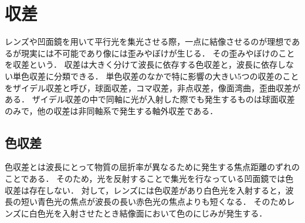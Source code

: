 

\section{収差}
レンズや凹面鏡を用いて平行光を集光させる際，一点に結像させるのが理想であるが現実には不可能であり像には歪みやぼけが生じる．
その歪みやぼけのことを収差という．
収差は大きく分けて波長に依存する色収差と，波長に依存しない単色収差に分類できる．
単色収差のなかで特に影響の大きい5つの収差のことをザイデル収差と呼び，球面収差，コマ収差，非点収差，像面湾曲，歪曲収差がある．
ザイデル収差の中で同軸に光が入射した際でも発生するものは球面収差のみで，他の収差は非同軸系で発生する軸外収差である\cite{syuusa}．

\subsection{色収差}
色収差とは波長にとって物質の屈折率が異なるために発生する焦点距離のずれのことである．
そのため，光を反射することで集光を行なっている凹面鏡では色収差は存在しない．
対して，レンズには色収差があり白色光を入射すると，波長の短い青色光の焦点が波長の長い赤色光の焦点よりも短くなる．
そのためレンズに白色光を入射させたとき結像面において色のにじみが発生する\cite{irosyuusa}．



